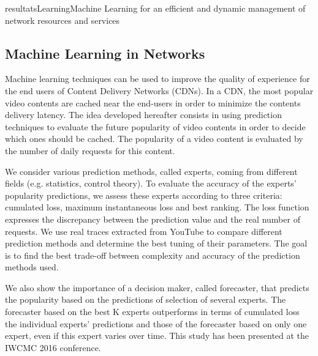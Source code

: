 \documentclass{ra2016}
\begin{document}
\begin{module}{resultats}{Learning}{Machine Learning for an efficient and dynamic management of network resources and services}

\subsection{Machine Learning in Networks}

\begin{participants}
\end{participants}

Machine learning techniques can be used to improve the quality of experience for the end users of Content Delivery Networks (CDNs). In a CDN, the most popular video contents are cached near the end-users in order to minimize the contents delivery latency. The idea developed hereafter consists in using prediction techniques to evaluate the future popularity of video contents in order to decide which ones should be cached. The popularity of a video content is evaluated by the number of daily requests for this content.

We consider various prediction methods, called experts, coming from different fields (e.g. statistics, control theory). To evaluate the accuracy of the experts' popularity predictions, we assess these experts according to three criteria: cumulated loss, maximum instantaneous loss and best ranking. The loss function expresses the discrepancy between the prediction value and the real number of requests. We use real traces extracted from YouTube to compare different prediction methods and determine the best tuning of their parameters. The goal is to find the best trade-off between complexity and accuracy of the prediction methods used.

We also show the importance of a decision maker, called forecaster, that predicts the popularity based on the predictions of selection of several experts. The forecaster based on the best K experts outperforms in terms of cumulated loss the individual experts' predictions and those of the forecaster based on only one expert, even if this expert varies over time. This study has been presented at the IWCMC 2016 conference.


\end{module}
\end{document}
